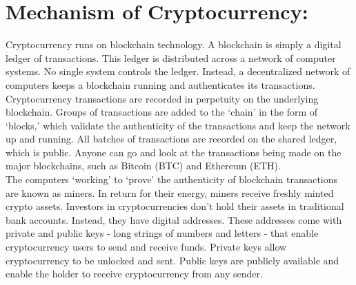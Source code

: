 \documentclass[11pt]{article}
\begin{document}
\section*{Mechanism of Cryptocurrency:}
Cryptocurrency runs on blockchain technology. A blockchain is simply a digital ledger of transactions. This ledger is distributed across a network of computer systems. No single system controls the ledger. Instead, a decentralized network of computers keeps a blockchain running and authenticates its transactions. Cryptocurrency transactions are recorded in perpetuity on the underlying blockchain. Groups of transactions are added to the ‘chain’ in the form of ‘blocks,’ which validate the authenticity of the transactions and keep the network up and running. All batches of transactions are recorded on the shared ledger, which is public. Anyone can go and look at the transactions being made on the major blockchains, such as Bitcoin (BTC) and Ethereum (ETH). \\
\indent The computers ‘working’ to ‘prove’ the authenticity of blockchain transactions are known as miners. In return for their energy, miners receive freshly minted crypto assets. Investors in cryptocurrencies don’t hold their assets in traditional bank accounts. Instead, they have digital addresses. These addresses come with private and public keys - long strings of numbers and letters - that enable cryptocurrency users to send and receive funds. Private keys allow cryptocurrency to be unlocked and sent. Public keys are publicly available and enable the holder to receive cryptocurrency from any sender.
\end{document}
